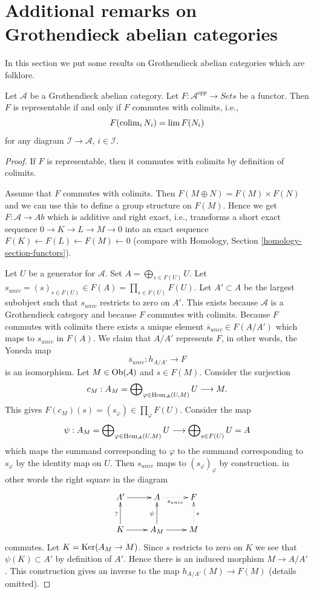 \section{Additional remarks on Grothendieck abelian categories}
\label{section-additional-Grothendieck}

\noindent
In this section we put some results on Grothendieck abelian categories
which are folklore.

\begin{lemma}
\label{lemma-grothendieck-brown}
Let $\mathcal{A}$ be a Grothendieck abelian category.
Let $F : \mathcal{A}^{opp} \to \textit{Sets}$ be a functor.
Then $F$ is representable if and only if $F$ commutes with colimits, i.e.,
$$
F(\mathop{\mathrm{colim}}\nolimits_i N_i) = \mathop{\mathrm{lim}}\nolimits F(N_i)
$$
for any diagram $\mathcal{I} \to \mathcal{A}$, $i \in \mathcal{I}$.
\end{lemma}

\begin{proof}
If $F$ is representable, then it commutes with colimits by definition
of colimits.

\medskip\noindent
Assume that $F$ commutes with colimits. Then $F(M \oplus N) = F(M) \times F(N)$
and we can use this to define a group structure on $F(M)$. Hence we get
$F : \mathcal{A} \to \textit{Ab}$ which is additive and right exact, i.e.,
transforms a short exact sequence $0 \to K \to L \to M \to 0$ into an exact
sequence $F(K) \leftarrow F(L) \leftarrow F(M) \leftarrow 0$ (compare with
Homology, Section \ref{homology-section-functors}).

\medskip\noindent
Let $U$ be a generator for $\mathcal{A}$. Set $A = \bigoplus_{s \in F(U)} U$.
Let $s_{univ} = (s)_{s \in F(U)} \in F(A) = \prod_{s \in F(U)} F(U)$. Let
$A' \subset A$ be the largest subobject such that $s_{univ}$ restricts to
zero on $A'$. This exists because $\mathcal{A}$ is a Grothendieck category
and because $F$ commutes with colimits. Because $F$ commutes with colimits
there exists a unique element $\overline{s}_{univ} \in F(A/A')$ which
maps to $s_{univ}$ in $F(A)$. We claim that $A/A'$ represents $F$, in
other words, the Yoneda map
$$
\overline{s}_{univ} : h_{A/A'} \longrightarrow F
$$
is an isomorphism. Let $M \in \mathop{\mathrm{Ob}}\nolimits(\mathcal{A})$ and $s \in F(M)$. Consider
the surjection
$$
c_M :
A_M = \bigoplus\nolimits_{\varphi \in \mathop{\mathrm{Hom}}\nolimits_\mathcal{A}(U, M)} U
\longrightarrow
M.
$$
This gives $F(c_M)(s) = (s_\varphi) \in \prod_\varphi F(U)$.
Consider the map
$$
\psi :
A_M = \bigoplus\nolimits_{\varphi \in \mathop{\mathrm{Hom}}\nolimits_\mathcal{A}(U, M)} U
\longrightarrow
\bigoplus\nolimits_{s \in F(U)} U = A
$$
which maps the summand corresponding to $\varphi$ to the summand
corresponding to $s_\varphi$ by the identity map on $U$. Then $s_{univ}$
maps to $(s_\varphi)_\varphi$ by construction.
in other words the right square in the diagram
$$
\xymatrix{
A' \ar[r] &
A \ar@{..>}[r]_{s_{univ}} & F \\
K \ar[r] \ar[u]^{?} & A_M \ar[u]^\psi \ar[r] &
M \ar@{..>}[u]_s
}
$$
commutes. Let $K = \mathop{\mathrm{Ker}}(A_M \to M)$. Since $s$ restricts to zero
on $K$ we see that $\psi(K) \subset A'$ by definition of $A'$. Hence there
is an induced morphism $M \to A/A'$. This construction gives an inverse
to the map $h_{A/A'}(M) \to F(M)$ (details omitted).
\end{proof}

